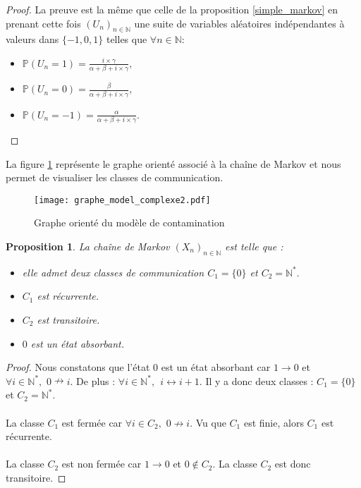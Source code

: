 \documentclass[12pt,a4paper]{report}
\newtheorem{prop}[thm]{Proposition}
\theoremstyle{remark}
\begin{document}
\begin{proof}
La preuve est la même que celle de la proposition \ref{simple_markov} en prenant cette fois $(U_n)_{n\in \mathbb{N}}$ une suite de variables aléatoires indépendantes à valeurs dans $\{-1, 0, 1\}$ telles que $\forall n \in \mathbb{N}$: \\
\begin{itemize}
    \item $\mathbb{P}(U_n=1)= \frac{i \times \gamma}{\alpha+\beta+i \times \gamma},$
    \item $\mathbb{P}(U_n=0)= \frac{\beta}{\alpha+\beta+i \times \gamma},$
    \item $\mathbb{P}(U_n=-1)= \frac{\alpha}{\alpha+\beta+i \times \gamma}.$
\end{itemize}
\end{proof}

La figure \ref{fig:my_label2} représente le graphe orienté associé à la chaîne de Markov et nous permet de visualiser les classes de communication.

\begin{figure}[h]
    \centering
\texttt{[image: graphe\_model\_complexe2.pdf]}
\caption{Graphe orienté du modèle de contamination}
    \label{fig:my_label2}
\end{figure}

\begin{prop}
La chaîne de Markov $(X_n)_{n \in \mathbb{N}}$ est telle que :
\begin{itemize}
    \item elle admet deux classes de communication $C_1=\{0\}$ et $C_2=\mathbb{N}^*.$
    \item $C_1$ est récurrente.
    \item $C_2$ est transitoire.
    \item $0$ est un état absorbant.
\end{itemize}
\end{prop}
\begin{proof}
Nous constatons que l'état $0$ est un état absorbant car $1 \longrightarrow 0$ et $\forall i \in \mathbb{N}^*, \, \, 0 \nrightarrow i$. De plus : $\forall i \in \mathbb{N}^*,\ \  i \longleftrightarrow i+1$. Il y a donc deux classes : $C_1=\{0\}$ et $C_2=\mathbb{N}^*.$
\\
\\
La classe $C_1$ est fermée car $\forall i \in C_2, \, \, 0 \nrightarrow i$. Vu que $C_1$ est finie, alors $C_1$ est récurrente.
\\
\\
La classe $C_2$ est non fermée car $1 \rightarrow 0$ et $0 \notin C_2$. La classe $C_2$ est donc transitoire.
\end{proof}
\end{document}
